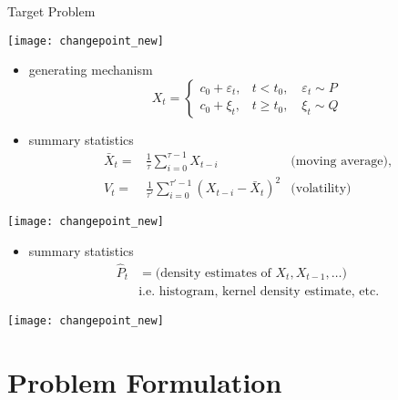 \documentclass[fleqn,aspectratio=1610]{beamer}
\begin{document}
\begin{frame}[label={sec:org40686f9},t]{Target Problem}
\begin{center}
\texttt{[image: changepoint\_new]}
\end{center}
\begin{overprint}
\begin{itemize}
\item generating mechanism
\begin{equation}
  X_{t}=
  \begin{cases}
    c_{0}+\varepsilon_{t},&t<t_{0}, \quad\varepsilon_{t}\sim P\\
    c_{0}+\xi_{t},&t\geq t_{0}, \quad\xi_{t}\sim Q
  \end{cases}
\end{equation}
\end{itemize}
\begin{itemize}
\item summary statistics
\begin{align}
  \bar{X}_{t}=&\frac{1}{\tau}\sum_{i=0}^{\tau-1}X_{t-i}
  &\text{(moving average)},\\
  V_{t}=&\frac{1}{\tau'}\sum_{i=0}^{\tau'-1}(X_{t-i}-\bar{X}_{t})^{2}
               &\text{(volatility)}
\end{align}
\end{itemize}
\begin{center}
\texttt{[image: changepoint\_new]}
\end{center}
\begin{itemize}
\item summary statistics
\begin{align}
  \hat{P}_{t}
  &=\text{(density estimates of \(X_{t},X_{t-1},\dotsc\))}\\
  &\text{i.e. histogram, kernel density estimate, etc.}
\end{align}
\end{itemize}
\begin{center}
\texttt{[image: changepoint\_new]}
\end{center}
\end{overprint}
\end{frame}


\section{Problem Formulation}
\label{sec:org217cdcf}
\end{document}
